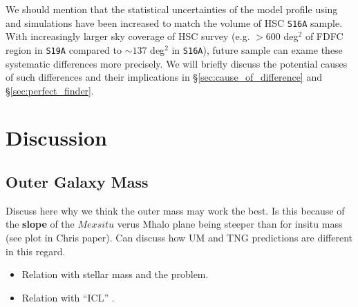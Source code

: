 \documentclass[a4paper,fleqn,usenatbib]{mnras}
\begin{document}
    We should mention that the statistical uncertainties of the model \dsigma{} profile 
    using  and \smdpl{} simulations have been increased to match the volume of 
    HSC \texttt{S16A} sample.
    With increasingly larger sky coverage of HSC survey (e.g. $>600$ deg$^2$ of FDFC region 
    in \texttt{S19A} compared to $\sim 137$ deg$^2$ in \texttt{S16A}), future sample can 
    exame these systematic differences more precisely. 
    We will briefly discuss the potential causes of such differences and their implications
    in \S \ref{sec:cause_of_difference} and \S \ref{sec:perfect_finder}.

\section{Discussion}
    \label{sec:discussion}


\subsection{Outer Galaxy Mass}
    \label{sec:outer_mstar}

    Discuss here why we think the outer mass may work the best. Is this because of the
    \textbf{slope} of the $Mexsitu$ verus Mhalo plane being steeper than for insitu mass (see
    plot in Chris paper). Can discuss how UM and TNG predictions are different in this regard.



    \begin{itemize}

        \item Relation with \exsitu{} stellar mass and the problem. 

        \item Relation with ``ICL'' \mstar{}.

    \end{itemize}
\end{document}
